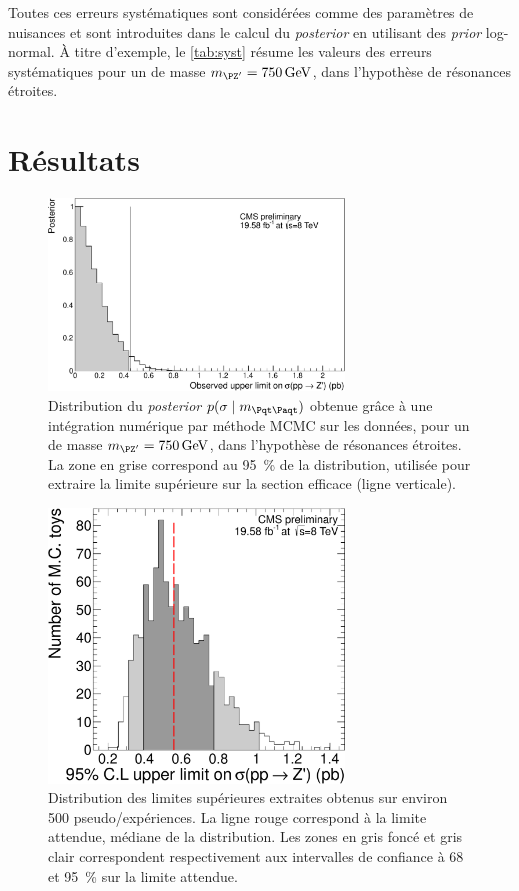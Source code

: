 Toutes ces erreurs systématiques sont considérées comme des paramètres de nuisances et sont introduites dans le calcul du \emph{posterior} en utilisant des \emph{prior} log-normal. À titre d'exemple, le \cref{tab:syst} résume les valeurs des erreurs systématiques pour un \zprime de masse $\mzp = \SI{750}{\GeV}$, dans l'hypothèse de résonances étroites.

\section{Résultats}

\begin{figure}[p!]
  \centering
  \includegraphics[width=0.7\textwidth]{chapitre7/figs/posterior_plot_750.pdf}
  \caption{Distribution du \emph{posterior} $p(\sigma \mid \mtt)$ obtenue grâce à une intégration numérique par méthode MCMC sur les données, pour un \zprime de masse $\mzp = \SI{750}{\GeV}$, dans l'hypothèse de résonances étroites. La zone en grise correspond au \SI{95}{\percent} de la distribution, utilisée pour extraire la limite supérieure sur la section efficace (ligne verticale).}
  \label{fig:posterior}
\end{figure}

\begin{figure}[p!]
  \centering
  \includegraphics[width=0.7\textwidth]{chapitre7/figs/posterior_plot_expected_750.pdf}
  \caption{Distribution des limites supérieures extraites obtenus sur environ 500 pseudo\-/expériences. La ligne rouge correspond à la limite attendue, médiane de la distribution. Les zones en gris foncé et gris clair correspondent respectivement aux intervalles de confiance à 68 et \SI{95}{\%} sur la limite attendue.}
  \label{fig:posterior_mc}
\end{figure}

